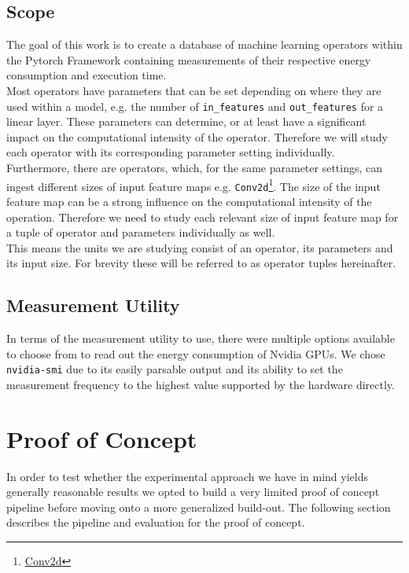 \documentclass[conference]{IEEEtran}
\begin{document}
\subsection{Scope}
The goal of this work is to create a database of machine learning operators within the Pytorch Framework containing measurements of their respective energy consumption and execution time. \\
Most operators have parameters that can be set depending on where they are used within a model, e.g. the number of \texttt{in\_features} and \texttt{out\_features} for a linear layer.
These parameters can determine, or at least have a significant impact on the computational intensity of the operator. Therefore we will study each operator with its corresponding parameter setting individually. \\
Furthermore, there are operators, which, for the same parameter settings, can ingest different sizes of input feature maps e.g. \texttt{Conv2d}\footnote{\href{https://pytorch.org/docs/stable/generated/torch.nn.Conv2d.html}{Conv2d}}. The size of the input feature map can be a strong influence on the computational intensity of the operation. Therefore we need to study each relevant size of input feature map for a tuple of operator and parameters individually as well. \\
This means the units we are studying consist of an operator, its parameters and its input size. For brevity these will be referred to as operator tuples hereinafter.




\subsection{Measurement Utility}
In terms of the measurement utility to use, there were multiple options available to choose from to read out the energy consumption of Nvidia GPUs. We chose \texttt{nvidia-smi} due to its easily parsable output and its ability to set the measurement frequency to the highest value supported by the hardware directly.


\section{Proof of Concept}

In order to test whether the experimental approach we have in mind yields generally reasonable results we opted to build a very limited proof of concept pipeline before moving onto a more generalized build-out. The following section describes the pipeline and evaluation for the proof of concept.
\end{document}
